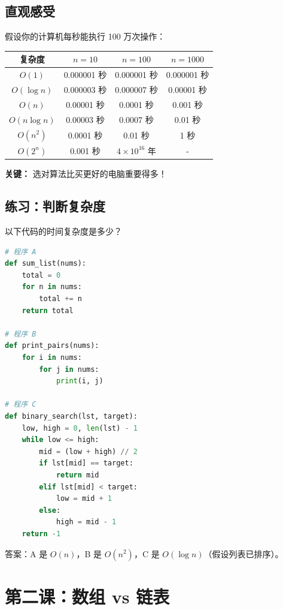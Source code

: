 \documentclass[a4paper,12pt]{ctexart}
\begin{document}
\subsection*{直观感受}

假设你的计算机每秒能执行 100 万次操作：

\begin{center}
\begin{tabular}{|c|c|c|c|}
\hline
\textbf{复杂度} & \textbf{$n=10$} & \textbf{$n=100$} & \textbf{$n=1000$} \\ \hline
$O(1)$ & 0.000001 秒 & 0.000001 秒 & 0.000001 秒 \\ \hline
$O(\log n)$ & 0.000003 秒 & 0.000007 秒 & 0.00001 秒 \\ \hline
$O(n)$ & 0.00001 秒 & 0.0001 秒 & 0.001 秒 \\ \hline
$O(n \log n)$ & 0.00003 秒 & 0.0007 秒 & 0.01 秒 \\ \hline
$O(n^2)$ & 0.0001 秒 & 0.01 秒 & 1 秒 \\ \hline
$O(2^n)$ & 0.001 秒 & $4 \times 10^{16}$ 年 & - \\ \hline
\end{tabular}
\end{center}

\textbf{关键：} 选对算法比买更好的电脑重要得多！

\subsection*{练习：判断复杂度}

以下代码的时间复杂度是多少？

\begin{lstlisting}[language=Python]
# 程序 A
def sum_list(nums):
    total = 0
    for n in nums:
        total += n
    return total

# 程序 B
def print_pairs(nums):
    for i in nums:
        for j in nums:
            print(i, j)

# 程序 C
def binary_search(lst, target):
    low, high = 0, len(lst) - 1
    while low <= high:
        mid = (low + high) // 2
        if lst[mid] == target:
            return mid
        elif lst[mid] < target:
            low = mid + 1
        else:
            high = mid - 1
    return -1
\end{lstlisting}

答案：A 是 $O(n)$，B 是 $O(n^2)$，C 是 $O(\log n)$（假设列表已排序）。

\section*{第二课：数组 vs 链表}
\end{document}
